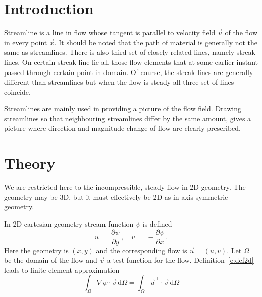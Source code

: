 \noindent
{}
\begin{versiona}

\section{Introduction}

Streamline is a line in flow whose tangent is parallel to velocity field
$\vec u$ of the flow in every point $\vec x$. It should be noted that the path of 
material is generally not the same as streamlines. There is also third set
of closely related lines, namely streak lines. On certain streak line
lie all those flow elements that at some earlier instant passed through
certain point in domain. Of course, the streak lines are generally different
than streamlines but when the flow is steady all three set of lines coincide.

Streamlines are mainly used in providing a picture of the flow field. 
Drawing streamlines so that neighbouring streamlines differ by the same amount, 
gives a picture where direction and magnitude change of flow are clearly prescribed.

\section{Theory}

We are restricted here to the incompressible, steady flow in 2D geometry.
The geometry may be 3D, but it must effectively be 2D as in axis symmetric
geometry.

In 2D cartesian geometry stream function $\psi$ is defined
\begin{equation}\label{e:def2d}
u \, = \, \frac{\partial \psi}{\partial y} \, , \quad
v \, = \, - \frac{\partial \psi}{\partial x} \,.
\end{equation}
Here the geometry is $(x,y)$ and the corresponding flow is $\vec u = (u,v)$.
Let $\Omega$ be the domain of the flow and $\vec v$ a test function for the flow.
Definition~\eqref{e:def2d} leads to finite element approximation
\begin{equation}\label{e:fem2D}
\int_\Omega \nabla \psi \cdot \vec v \, \text{d}\Omega
=
\int_\Omega \vec u^\perp \cdot \vec v \, \text{d}\Omega
\end{equation}


\end{versiona}
